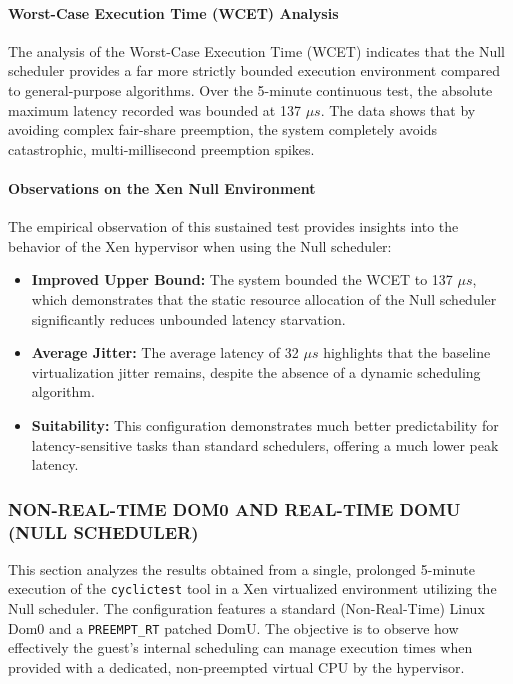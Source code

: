 \paragraph{Worst-Case Execution Time (WCET)
Analysis}\label{worst-case-execution-time-wcet-analysis-17}

The analysis of the Worst-Case Execution Time (WCET) indicates that the
Null scheduler provides a far more strictly bounded execution
environment compared to general-purpose algorithms. Over the 5-minute
continuous test, the absolute maximum latency recorded was bounded at
137 $\mu s$. The data shows that by avoiding complex fair-share preemption,
the system completely avoids catastrophic, multi-millisecond preemption
spikes.

\paragraph{Observations on the Xen Null
Environment}\label{observations-on-the-xen-null-environment}

The empirical observation of this sustained test provides insights into
the behavior of the Xen hypervisor when using the Null scheduler:

\begin{itemize}
\item
  \textbf{Improved Upper Bound:} The system bounded the WCET to 137 $\mu s$,
  which demonstrates that the static resource allocation of the Null
  scheduler significantly reduces unbounded latency starvation.
\item
  \textbf{Average Jitter:} The average latency of 32 $\mu s$ highlights that
  the baseline virtualization jitter remains, despite the absence of a
  dynamic scheduling algorithm.
\item
  \textbf{Suitability:} This configuration demonstrates much better
  predictability for latency-sensitive tasks than standard schedulers,
  offering a much lower peak latency.
\end{itemize}

\subsubsection{NON-REAL-TIME DOM0 AND REAL-TIME DOMU (NULL
SCHEDULER)}\label{non-real-time-dom0-and-real-time-domu-null-scheduler}

This section analyzes the results obtained from a single, prolonged
5-minute execution of the \texttt{cyclictest} tool in a Xen virtualized
environment utilizing the Null scheduler. The configuration features a
standard (Non-Real-Time) Linux Dom0 and a \texttt{PREEMPT\_RT} patched
DomU. The objective is to observe how effectively the guest's internal
scheduling can manage execution times when provided with a dedicated,
non-preempted virtual CPU by the hypervisor.

